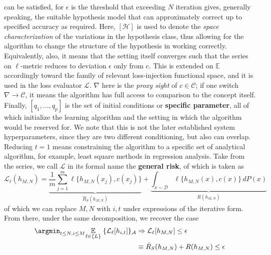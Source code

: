 can be satisfied, for $\epsilon$ is the threshold that exceeding $N$ iteration gives, generally speaking, the suitable hypothesis model that can approximately correct up to specified accuracy as required. Here, $[\mathcal{H}]$ is used to denote the \textit{space characterization} of the variations in the hypothesis class, thus allowing for the algorithm to change the structure of the hypothesis in working correctly. Equivalently, also, it means that the setting itself converges such that the series on $\ell$-metric reduces to deviation $\epsilon$ only from $c$. This is extended on $\mathbb{E}$ accordingly toward the family of relevant loss-injection functional space, and it is used in the loss evaluator $\mathcal{L}$. $\nabla$ here is the \textit{proxy sight} of $c\in\mathcal{C}$; if one switch $\nabla\to \mathcal{C}$, it means the algorithm has full access to comparison to the concept itself. Finally, $[q_{1},\dots,q_{p}] $ is the set of initial conditions or \textbf{specific parameter}, all of which initialize the learning algorithm and the setting in which the algorithm would be reserved for. We note that this is not the later established system hyperparameters, since they are two different conditioning, but also can overlap. Reducing $t=1$ means constraining the algorithm to a specific set of analytical algorithm, for example, least square methods in regression analysis. Take from the series, we call $\mathcal{L}$ in its formal name the \textbf{general risk}, of which is taken as
\begin{equation}
    \mathcal{L}_{\ell}(h_{M,N}) = \underbrace{\frac{1}{m}\sum_{j=1}^m \ell\{h_{M,N}(x_j), c(x_j)\}}_{\hat{R}_S(h_{M,N})} + \underbrace{\int_{x\sim\mathcal{D}} \ell\{h_{M,N}(x), c(x)\}\,dP(x)}_{R(h_{M,N})}
\end{equation}
of which we can replace $M,N$ with $i,t$ under expressions of the iterative form. From there, under the same decomposition, we recover the case
\begin{equation}
    \begin{split}
       \argmin_{t\leq N, i \leq M} \underset{\ell\in\{L\}}{\mathbb{E}}\; \{ \mathcal{L}_{\ell}[h_{i,t}] \}_{\mathcal{A}} &\Rightarrow \mathcal{L}_{\ell}[h_{M,N}]\leq \epsilon\\
        & \equiv \hat{R}_S(h_{M,N}) + R(h_{M,N}) \leq \epsilon
    \end{split}
\end{equation}
